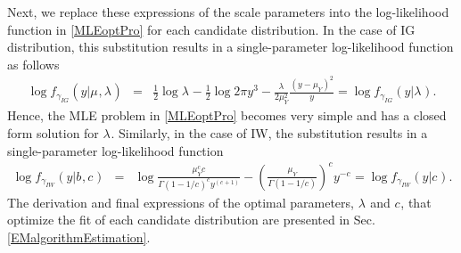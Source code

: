 \documentclass[12pt, draftclsnofoot, onecolumn]{IEEEtran}
\theoremstyle{plain}
\begin{document}
Next, we replace these expressions of the scale parameters into the log-likelihood function in \eqref{MLEoptPro} for each candidate distribution. In the case of IG distribution, this substitution results in a single-parameter log-likelihood function as follows %
\begin{eqnarray}
 \log f_{\gamma_{IG}}(y|{{\mu_{}}},{{\lambda_{}}}) %
 &=& \frac{1}{2} \log {{\lambda_{}}} - \frac{1}{2} \log 2\pi y^3 - \frac{{{\lambda_{}}}}{2\mu_{Y}^2} \frac{(y-\mu_{Y})^2}{y}=\log f_{\gamma_{IG}}(y|{{\lambda_{}}}). \label{logIG}
 \end{eqnarray}
Hence, the MLE problem in \eqref{MLEoptPro} becomes very simple and has a closed form solution for ${{\lambda_{}}}$. Similarly, in the case of IW, the substitution results in a single-parameter log-likelihood function %
\begin{eqnarray}
 \log f_{\gamma_{IW}}(y|{{b_{}}},{{c_{}}})%
 &=& \log \frac{\mu_{Y}^{{{c_{}}}} {{c_{}}}}{{\Gamma(1-1/{{c_{}}})}^{{{c_{}}}}  y^{({{c_{}}}+1)}} - {\left( \frac{\mu_Y}{\Gamma(1-1/{{c_{}}})} \right)}^{{{c_{}}}} y^{-{{c_{}}}} %
 = \log f_{\gamma_{IW}}(y|{{c_{}}}). \label{logIW}
 \end{eqnarray} 
The derivation and final expressions of the optimal parameters, ${{\lambda_{}}}$ and ${{c_{}}}$, that optimize the fit of each candidate distribution are presented in Sec. \ref{EMalgorithmEstimation}.  
\vspace{-.15in}
\end{document}
